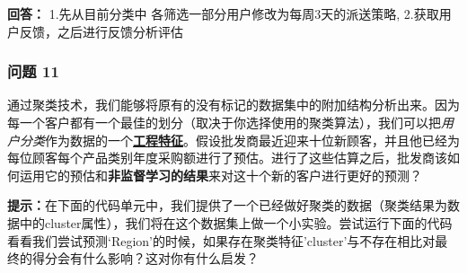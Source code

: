 \documentclass[11pt]{article}
\begin{document}
    \textbf{回答：} 1.先从目前分类中
各筛选一部分用户修改为每周3天的派送策略,
2.获取用户反馈，之后进行反馈分析评估

    \subsubsection{问题 11}\label{ux95eeux9898-11}

通过聚类技术，我们能够将原有的没有标记的数据集中的附加结构分析出来。因为每一个客户都有一个最佳的划分（取决于你选择使用的聚类算法），我们可以把\emph{用户分类}作为数据的一个\href{https://en.wikipedia.org/wiki/Feature_learning\#Unsupervised_feature_learning}{\textbf{工程特征}}。假设批发商最近迎来十位新顾客，并且他已经为每位顾客每个产品类别年度采购额进行了预估。进行了这些估算之后，批发商该如何运用它的预估和\textbf{非监督学习的结果}来对这十个新的客户进行更好的预测？

\textbf{提示：}在下面的代码单元中，我们提供了一个已经做好聚类的数据（聚类结果为数据中的cluster属性），我们将在这个数据集上做一个小实验。尝试运行下面的代码看看我们尝试预测`Region'的时候，如果存在聚类特征'cluster'与不存在相比对最终的得分会有什么影响？这对你有什么启发？
\end{document}
